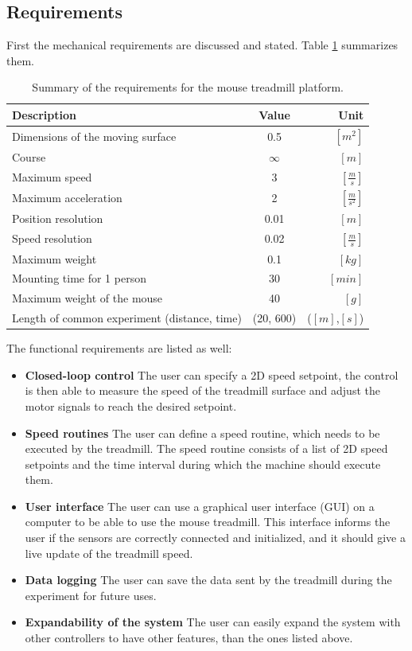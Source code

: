 \documentclass[12pt,a4paper, twoside]{article}
\begin{document}
\subsection{Requirements}
First the mechanical requirements are discussed and stated. Table \ref{tab:Requirements} summarizes them.
\begin{table}[H]
	\centering
	\begin{tabular}{l||c|r} 
		\textbf{Description}&\textbf{Value}  &\textbf{Unit}  \\ 
		\hline
		\hline 
		Dimensions of the moving surface & 0.5 & $[m^2]$ \\ 
		\hline 
		Course & $\infty$  & $[m]$  \\ 
		\hline 
		Maximum speed & 3 & $[\frac{m}{s}]$ \\ 
		\hline 
		Maximum acceleration & 2 & $[\frac{m}{s^2}]$  \\ 
		\hline 
		Position resolution & 0.01 & $[m]$  \\ 
		\hline 
		Speed resolution & 0.02  & $[\frac{m}{s}]$  \\ 
		\hline 
		Maximum weight & 0.1  & $[kg]$  \\  
		\hline 
		Mounting time for 1 person & 30 & $[min]$  \\
		\hline 
		Maximum weight of the mouse & 40  & $[g]$ \\
		\hline 
		Length of common experiment (distance, time) & (20, 600)  & ($[m]$,$[s]$)  \\
	\end{tabular} 
	\caption[Mechanical requirements]{Summary of the requirements for the mouse treadmill platform.}
	\label{tab:Requirements}
\end{table}
The functional requirements are listed as well:
\begin{itemize}
	\item \textbf{Closed-loop control} The user can specify a 2D speed setpoint, the control is then able to measure the speed of the treadmill surface and adjust the motor signals to reach the desired setpoint.
	\item \textbf{Speed routines} The user can define a speed routine, which needs to be executed by the treadmill. The speed routine consists of a list of 2D speed setpoints and the time interval during which the machine should execute them.
	\item \textbf{User interface} The user can use a graphical user interface (GUI) on a computer to be able to use the mouse treadmill. This interface informs the user if the sensors are correctly connected and initialized, and it should give a live update of the treadmill speed.
	\item \textbf{Data logging} The user can save the data sent by the treadmill during the experiment for future uses. 
	\item \textbf{Expandability of the system} The user can easily expand the system with other controllers to have other features, than the ones listed above.
\end{itemize}
\end{document}
